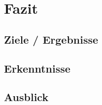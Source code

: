 \chapter{Fazit}
\label{fazit}

\section{Ziele / Ergebnisse}
\label{sec:ziele-ergebnisse}


\section{Erkenntnisse}
\label{sec:erkenntnisse}


\section{Ausblick}
\label{sec:ausblick}
